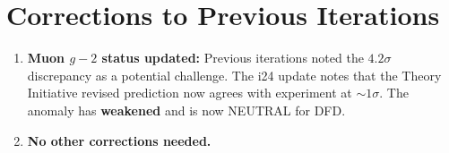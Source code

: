 \documentclass[11pt]{article}
\begin{document}
\section{Corrections to Previous Iterations}

\begin{tcolorbox}[colback=yellow!5!white, colframe=yellow!70!black,
  title=\textbf{CORRECTIONS FROM i24}]

\begin{enumerate}

\item \textbf{Muon $g-2$ status updated:} Previous iterations noted
  the $4.2\sigma$ discrepancy as a potential challenge. The i24 update
  notes that the Theory Initiative revised prediction now agrees with
  experiment at $\sim 1\sigma$. The anomaly has \textbf{weakened}
  and is now NEUTRAL for DFD.

\item \textbf{No other corrections needed.}

\end{enumerate}
\end{tcolorbox}
\end{document}
